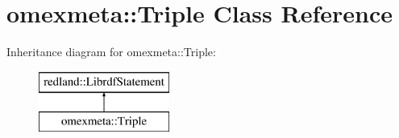 \hypertarget{classomexmeta_1_1Triple}{}\section{omexmeta\+:\+:Triple Class Reference}
\label{classomexmeta_1_1Triple}
Inheritance diagram for omexmeta\+:\+:Triple\+:\begin{figure}[H]
\begin{center}
\leavevmode
\includegraphics[height=2.000000cm]{classomexmeta_1_1Triple}
\end{center}
\end{figure}
